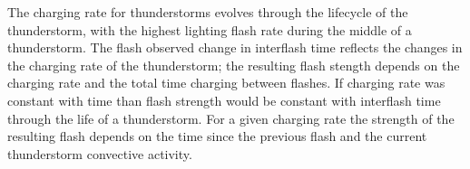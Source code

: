 The charging rate for thunderstorms evolves through the lifecycle of the thunderstorm, with the highest lighting flash rate during the middle of a thunderstorm.
The flash observed change in interflash time reflects the changes in the charging rate of the thunderstorm; the resulting flash stength depends on the charging rate and the total time charging between flashes.
If charging rate was constant with time than flash strength would be constant with interflash time through the life of a thunderstorm.
For a given charging rate the strength of the resulting flash depends on the time since the previous flash and the current thunderstorm convective activity.
